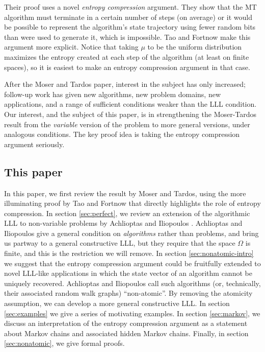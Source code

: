 \documentclass{article}
\begin{document}
Their proof uses a novel \emph{entropy compression} argument.  They show that the MT algorithm must terminate in a certain number of steps (on average) or it would be possible to represent the algorithm's state trajectory using fewer random bits than were used to generate it, which is impossible.  Tao \cite{tao2009entropy} and Fortnow \cite{fortnow2009entropy} make this argument more explicit.  Notice that taking $\mu$ to be the uniform distribution maximizes the entropy created at each step of the algorithm (at least on finite spaces), so it is easiest to make an entropy compression argument in that case.

After the Moser and Tardos paper, interest in the subject has only increased; follow-up work has given new algorithms, new problem domains, new applications, and a range of sufficient conditions weaker than the LLL condition.  Our interest, and the subject of this paper, is in strengthening the Moser-Tardos result from the \emph{variable} version of the problem to more general versions, under analogous conditions.  The key proof idea is taking the entropy compression argument seriously. %

\subsection{This paper}
In this paper, we first review the result by Moser and Tardos, using the more illuminating proof by Tao \cite{tao2009entropy} and Fortnow \cite{fortnow2009entropy} that directly highlights the role of entropy compression.  In section \ref{sec:perfect}, we review an extension of the algorithmic LLL to non-variable problems by Achlioptas and Iliopoulos \cite{achlioptas2014random}.  Achlioptas and Iliopoulos give a general condition on \emph{algorithms} rather than problems, and bring us partway to a general constructive LLL, but they require that the space $\Omega$ is finite, and this is the restriction we will remove.  In section \ref{sec:nonatomic-intro} we suggest that the entropy compression argument could be fruitfully extended to novel LLL-like applications in which the state vector of an algorithm cannot be uniquely recovered.  Achlioptas and Iliopoulos call such algorithms (or, technically, their associated random walk graphs) ``non-atomic''.  By removing the atomicity assumption, we can develop a more general constructive LLL. In section \ref{sec:examples} we give a series of motivating examples.  In section \ref{sec:markov}, we discuss an interpretation of the entropy compression argument as a statement about Markov chains and associated hidden Markov chains.  Finally, in section \ref{sec:nonatomic}, we give formal proofs.
\end{document}
